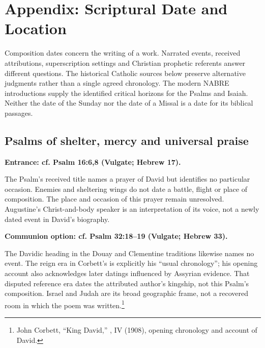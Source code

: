 \clearpage
\section{Appendix: Scriptural Date and Location}
\label{historical-appendix}



Composition dates concern the writing of a work. Narrated events, received attributions, superscription settings and Christian prophetic referents answer different questions. The historical Catholic sources below preserve alternative judgments rather than a single agreed chronology. The modern NABRE introductions supply the identified critical horizons for the Psalms and Isaiah. Neither the date of the Sunday nor the date of a Missal is a date for its biblical passages.

\subsection{Psalms of shelter, mercy and universal praise}
\label{history-psalms}
\textbf{Entrance: cf. Psalm 16:6,8 (Vulgate; Hebrew 17).}

The Psalm's received title names a prayer of David but identifies no particular occasion. Enemies and sheltering wings do not date a battle, flight or place of composition. The place and occasion of this prayer remain unresolved. Augustine's Christ-and-body speaker is an interpretation of its voice, not a newly dated event in David's biography.

\textbf{Communion option: cf. Psalm 32:18--19 (Vulgate; Hebrew 33).}

The Davidic heading in the Douay and Clementine traditions likewise names no event. The reign era in Corbett's  is explicitly his ``usual chronology''; his opening account also acknowledges later datings influenced by Assyrian evidence. That disputed reference era dates the attributed author's kingship, not this Psalm's composition. Israel and Judah are its broad geographic frame, not a recovered room in which the poem was written.\footnote{John Corbett, ``King David,'' , IV (1908), opening chronology and account of David.}


